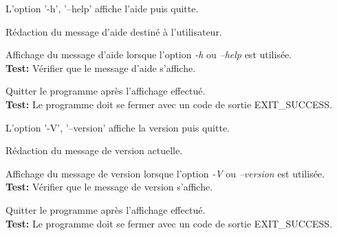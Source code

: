 \documentclass{article}
\begin{document}
\begin{needbox}
    L'option '-h', '--help' affiche l'aide puis quitte.
    \begin{subneedbox}[F16.1: Texte]
        Rédaction du message d'aide destiné à l'utilisateur.
    \end{subneedbox}
    \begin{subneedbox}[F16.2: Affichage]
        Affichage du message d'aide lorsque l'option \textit{-h} ou \textit{--help} est utilisée.\\
        \textbf{Test:} Vérifier que le message d'aide s'affiche.
    \end{subneedbox}
    \begin{subneedbox}[F16.3: Quitter]
        Quitter le programme après l'affichage effectué.\\
        \textbf{Test:} Le programme doit se fermer avec un code de sortie EXIT\_SUCCESS.
    \end{subneedbox}
\end{needbox}

\begin{needbox}
    L'option '-V', '--version' affiche la version puis quitte.
    \begin{subneedbox}[F17.1: Texte]
        Rédaction du message de version actuelle.
    \end{subneedbox}
    \begin{subneedbox}[F17.2: Affichage]
        Affichage du message de version lorsque l'option \textit{-V} ou \textit{--version} est utilisée.\\
        \textbf{Test:} Vérifier que le message de version s'affiche.
    \end{subneedbox}
    \begin{subneedbox}[F17.3: Quitter]
        Quitter le programme après l'affichage effectué.\\
        \textbf{Test:} Le programme doit se fermer avec un code de sortie EXIT\_SUCCESS.
    \end{subneedbox}
\end{needbox}
\end{document}
